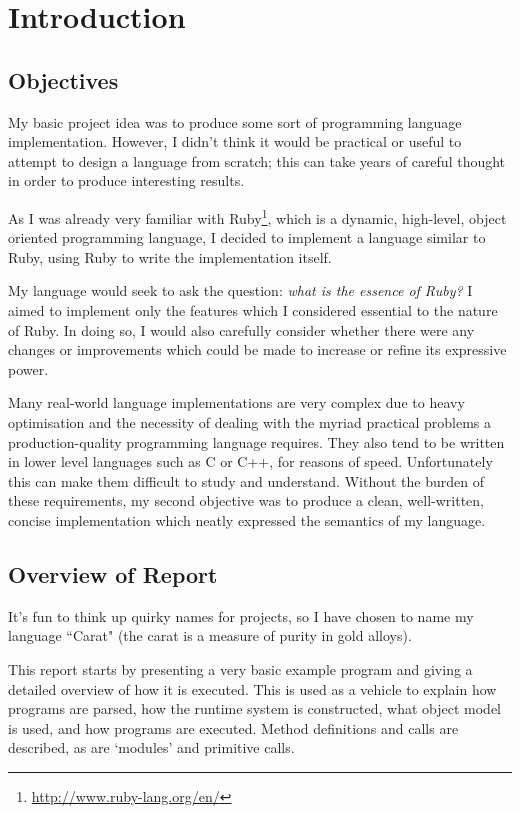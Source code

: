 \section{Introduction}

\subsection{Objectives}

My basic project idea was to produce some sort of programming language implementation. However, I didn't think it would be practical or useful to attempt to design a language from scratch; this can take years of careful thought in order to produce interesting results.

As I was already very familiar with Ruby\footnote{\url{http://www.ruby-lang.org/en/}}, which is a dynamic, high-level, object oriented programming language, I decided to implement a language similar to Ruby, using Ruby to write the implementation itself.

My language would seek to ask the question: \textit{what is the essence of Ruby?} I aimed to implement only the features which I considered essential to the nature of Ruby. In doing so, I would also carefully consider whether there were any changes or improvements which could be made to increase or refine its expressive power.

Many real-world language implementations are very complex due to heavy optimisation and the necessity of dealing with the myriad practical problems a production-quality programming language requires. They also tend to be written in lower level languages such as C or C++, for reasons of speed. Unfortunately this can make them difficult to study and understand. Without the burden of these requirements, my second objective was to produce a clean, well-written, concise implementation which neatly expressed the semantics of my language.

\subsection{Overview of Report}

It's fun to think up quirky names for projects, so I have chosen to name my language ``Carat" (the carat is a measure of purity in gold alloys).

This report starts by presenting a very basic example program and giving a detailed overview of how it is executed. This is used as a vehicle to explain how programs are parsed, how the runtime system is constructed, what object model is used, and how programs are executed. Method definitions and calls are described, as are `modules' and primitive calls.

